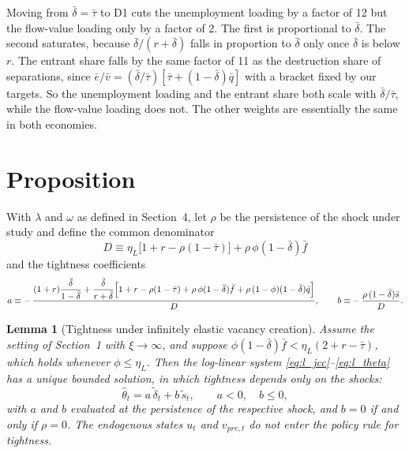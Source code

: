 \documentclass[authoryear, review, 12pt]{elsarticle}
\newtheorem{lemma}{Lemma}
\begin{document}
Moving from $\bar\delta=\bar\tau$ to D1 cuts the unemployment loading by a factor of 12 but
the flow-value loading only by a factor of 2. The first is proportional to $\bar\delta$. The
second saturates, because $\bar\delta/(r+\bar\delta)$ falls in proportion to $\bar\delta$
only once $\bar\delta$ is below $r$. The entrant share falls by the same factor of 11 as
the destruction share of separations, since
$\bar e/\bar v=(\bar\delta/\bar\tau)[\bar\tau+(1-\bar\delta)\bar q]$ with a bracket fixed by
our targets. So the unemployment loading and the entrant share both scale with
$\bar\delta/\bar\tau$, while the flow-value loading does not. The other weights are
essentially the same in both economies.

\section{Proposition}

With $\lambda$ and $\omega$ as defined in Section~4, let $\rho$ be the persistence of the
shock under study and define the common denominator
\[
	D\equiv\eta_L\bigl[1+r-\rho(1-\bar\tau)\bigr]+\rho\,\phi(1-\bar\delta)\bar f
\]
and the tightness coefficients
\begin{equation}\label{eq:a}
	a\equiv-\,\frac{(1+r)\dfrac{\bar\delta}{1-\bar\delta}
	+\dfrac{\bar\delta}{r+\bar\delta}\Bigl[1+r-\rho(1-\bar\tau)+\rho\,\phi(1-\bar\delta)\bar f
	+\rho\,(1-\phi)(1-\bar\delta)\bar q\Bigr]}{D},
	\qquad
	b\equiv-\,\frac{\rho\,(1-\bar\delta)\bar s}{D}.
\end{equation}

\begin{lemma}[Tightness under infinitely elastic vacancy creation]\label{lem:theta}
Assume the setting of Section~1 with $\xi\to\infty$, and suppose
$\phi(1-\bar\delta)\bar f<\eta_L(2+r-\bar\tau)$, which holds whenever $\phi\le\eta_L$. Then the
log-linear system \eqref{eq:l_jcc}--\eqref{eq:l_theta} has a unique bounded solution, in
which tightness depends only on the shocks:
\[
	\hat\theta_t=a\,\tilde\delta_t+b\,\tilde s_t,\qquad a<0,\quad b\le0,
\]
with $a$ and $b$ evaluated at the persistence of the respective shock, and $b=0$ if and only
if $\rho=0$. The endogenous states $u_t$ and $v_{pre,t}$ do not enter the policy rule for
tightness.
\end{lemma}
\end{document}
